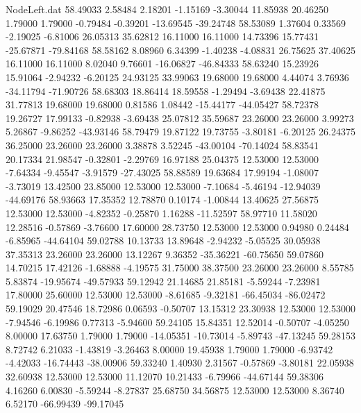 \begin{filecontents}{NodeLeft.dat}
  58.49033    2.58484    2.18201    -1.15169   -3.30044   11.85938   20.46250    1.79000    1.79000   -0.79484   -0.39201  -13.69545  -39.24748
  58.53089    1.37604    0.33569    -2.19025   -6.81006   26.05313   35.62812   16.11000   16.11000   14.73396   15.77431  -25.67871  -79.84168
  58.58162    8.08960    6.34399    -1.40238   -4.08831   26.75625   37.40625   16.11000   16.11000    8.02040    9.76601  -16.06827  -46.84333
  58.63240   15.23926   15.91064    -2.94232   -6.20125   24.93125   33.99063   19.68000   19.68000    4.44074    3.76936  -34.11794  -71.90726
  58.68303   18.86414   18.59558    -1.29494   -3.69438   22.41875   31.77813   19.68000   19.68000    0.81586    1.08442  -15.44177  -44.05427
  58.72378   19.26727   17.99133    -0.82938   -3.69438   25.07812   35.59687   23.26000   23.26000    3.99273    5.26867   -9.86252  -43.93146
  58.79479   19.87122   19.73755    -3.80181   -6.20125   26.24375   36.25000   23.26000   23.26000    3.38878    3.52245  -43.00104  -70.14024
  58.83541   20.17334   21.98547    -0.32801   -2.29769   16.97188   25.04375   12.53000   12.53000   -7.64334   -9.45547   -3.91579  -27.43025
  58.88589   19.63684   17.99194    -1.08007   -3.73019   13.42500   23.85000   12.53000   12.53000   -7.10684   -5.46194  -12.94039  -44.69176
  58.93663   17.35352   12.78870     0.10174   -1.00844   13.40625   27.56875   12.53000   12.53000   -4.82352   -0.25870    1.16288  -11.52597
  58.97710   11.58020   12.28516    -0.57869   -3.76600   17.60000   28.73750   12.53000   12.53000    0.94980    0.24484   -6.85965  -44.64104
  59.02788   10.13733   13.89648    -2.94232   -5.05525   30.05938   37.35313   23.26000   23.26000   13.12267    9.36352  -35.36221  -60.75650
  59.07860   14.70215   17.42126    -1.68888   -4.19575   31.75000   38.37500   23.26000   23.26000    8.55785    5.83874  -19.95674  -49.57933
  59.12942   21.14685   21.85181    -5.59244   -7.23981   17.80000   25.60000   12.53000   12.53000   -8.61685   -9.32181  -66.45034  -86.02472
  59.19029   20.47546   18.72986     0.06593   -0.50707   13.15312   23.30938   12.53000   12.53000   -7.94546   -6.19986    0.77313   -5.94600
  59.24105   15.84351   12.52014    -0.50707   -4.05250    8.00000   17.63750    1.79000    1.79000  -14.05351  -10.73014   -5.89743  -47.13245
  59.28153    8.72742    6.21033    -1.43819   -3.26463    8.00000   19.45938    1.79000    1.79000   -6.93742   -4.42033  -16.74443  -38.00906
  59.33240    1.40930    2.31567    -0.57869   -3.80181   22.05938   32.60938   12.53000   12.53000   11.12070   10.21433   -6.79966  -44.67144
  59.38306    4.16260    6.00830    -5.59244   -8.27837   25.68750   34.56875   12.53000   12.53000    8.36740    6.52170  -66.99439  -99.17045

\end{filecontents}
